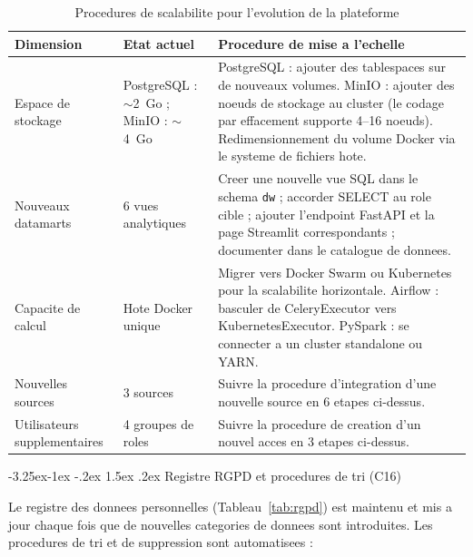 \documentclass[a4paper,11pt,oneside,openany]{report}
\makeatletter
\renewcommand\subsection{\@startsection{subsection}{2}{\z@}%
  {-3.25ex\@plus -1ex \@minus -.2ex}%
  {1.5ex \@plus .2ex}%
  {\normalfont\large\bfseries\color{ntdarkgreen}}}
\newcommand{\rgpd}{RGPD}
\makeatother
\begin{document}
\begin{table}[H]
\centering
\caption{Procedures de scalabilite pour l'evolution de la plateforme}
\label{tab:scalability}
\begin{tabularx}{\textwidth}{L{3cm} L{3cm} L{6.5cm}}
\toprule
\textbf{Dimension} & \textbf{Etat actuel} & \textbf{Procedure de mise a l'echelle} \\
\midrule
Espace de stockage & PostgreSQL : $\sim$2~Go ; MinIO : $\sim$4~Go & PostgreSQL : ajouter des tablespaces sur de nouveaux volumes. MinIO : ajouter des noeuds de stockage au cluster (le codage par effacement supporte 4--16 noeuds). Redimensionnement du volume Docker via le systeme de fichiers hote. \\
Nouveaux datamarts & 6 vues analytiques & Creer une nouvelle vue SQL dans le schema \texttt{dw} ; accorder SELECT au role cible ; ajouter l'endpoint FastAPI et la page Streamlit correspondants ; documenter dans le catalogue de donnees. \\
Capacite de calcul & Hote Docker unique & Migrer vers Docker Swarm ou Kubernetes pour la scalabilite horizontale. Airflow : basculer de CeleryExecutor vers KubernetesExecutor. PySpark : se connecter a un cluster standalone ou YARN. \\
Nouvelles sources & 3 sources & Suivre la procedure d'integration d'une nouvelle source en 6 etapes ci-dessus. \\
Utilisateurs supplementaires & 4 groupes de roles & Suivre la procedure de creation d'un nouvel acces en 3 etapes ci-dessus. \\
\bottomrule
\end{tabularx}
\end{table}

\subsection{Registre \rgpd{} et procedures de tri (C16)}

Le registre des donnees personnelles (Tableau~\ref{tab:rgpd}) est maintenu
et mis a jour chaque fois que de nouvelles categories de donnees sont
introduites. Les procedures de tri et de suppression sont automatisees :
\end{document}
